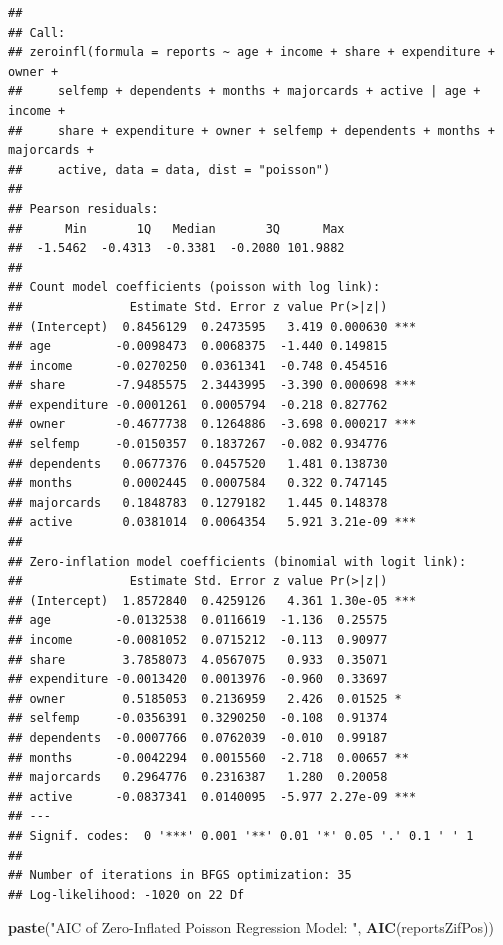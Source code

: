 \documentclass[
]{article}
\newenvironment{Shaded}{\begin{snugshade}}{\end{snugshade}}
\newcommand{\KeywordTok}[1]{\textcolor[rgb]{0.13,0.29,0.53}{\textbf{#1}}}
\newcommand{\NormalTok}[1]{#1}
\newcommand{\StringTok}[1]{\textcolor[rgb]{0.31,0.60,0.02}{#1}}
\begin{document}
\begin{verbatim}
## 
## Call:
## zeroinfl(formula = reports ~ age + income + share + expenditure + owner + 
##     selfemp + dependents + months + majorcards + active | age + income + 
##     share + expenditure + owner + selfemp + dependents + months + majorcards + 
##     active, data = data, dist = "poisson")
## 
## Pearson residuals:
##      Min       1Q   Median       3Q      Max 
##  -1.5462  -0.4313  -0.3381  -0.2080 101.9882 
## 
## Count model coefficients (poisson with log link):
##               Estimate Std. Error z value Pr(>|z|)    
## (Intercept)  0.8456129  0.2473595   3.419 0.000630 ***
## age         -0.0098473  0.0068375  -1.440 0.149815    
## income      -0.0270250  0.0361341  -0.748 0.454516    
## share       -7.9485575  2.3443995  -3.390 0.000698 ***
## expenditure -0.0001261  0.0005794  -0.218 0.827762    
## owner       -0.4677738  0.1264886  -3.698 0.000217 ***
## selfemp     -0.0150357  0.1837267  -0.082 0.934776    
## dependents   0.0677376  0.0457520   1.481 0.138730    
## months       0.0002445  0.0007584   0.322 0.747145    
## majorcards   0.1848783  0.1279182   1.445 0.148378    
## active       0.0381014  0.0064354   5.921 3.21e-09 ***
## 
## Zero-inflation model coefficients (binomial with logit link):
##               Estimate Std. Error z value Pr(>|z|)    
## (Intercept)  1.8572840  0.4259126   4.361 1.30e-05 ***
## age         -0.0132538  0.0116619  -1.136  0.25575    
## income      -0.0081052  0.0715212  -0.113  0.90977    
## share        3.7858073  4.0567075   0.933  0.35071    
## expenditure -0.0013420  0.0013976  -0.960  0.33697    
## owner        0.5185053  0.2136959   2.426  0.01525 *  
## selfemp     -0.0356391  0.3290250  -0.108  0.91374    
## dependents  -0.0007766  0.0762039  -0.010  0.99187    
## months      -0.0042294  0.0015560  -2.718  0.00657 ** 
## majorcards   0.2964776  0.2316387   1.280  0.20058    
## active      -0.0837341  0.0140095  -5.977 2.27e-09 ***
## ---
## Signif. codes:  0 '***' 0.001 '**' 0.01 '*' 0.05 '.' 0.1 ' ' 1 
## 
## Number of iterations in BFGS optimization: 35 
## Log-likelihood: -1020 on 22 Df
\end{verbatim}

\begin{Shaded}
\begin{Highlighting}[]
\KeywordTok{paste}\NormalTok{(}\StringTok{"AIC of Zero-Inflated Poisson Regression Model: "}\NormalTok{, }\KeywordTok{AIC}\NormalTok{(reportsZifPos))}
\end{Highlighting}
\end{Shaded}
\end{document}
